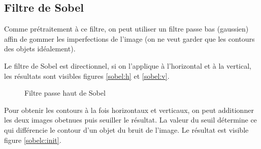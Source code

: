 \documentclass{article}
\begin{document}
\subsection{Filtre de Sobel}
Comme prétraitement à ce filtre, on peut utiliser un filtre passe bas (gaussien) affin de gommer les imperfections de
l'image
(on ne veut garder que les contours des objets idéalement).

Le filtre de Sobel est directionnel, si on l'applique à l'horizontal et à la vertical, les résultats sont visibles
figures \ref{sobel:h} et \ref{sobel:v}.

\begin{figure}[!ht]%
  \centering
  \hspace{0.030\textwidth}
  \caption{Filtre passe haut de Sobel}
  \label{rehauss:init}
\end{figure}

Pour obtenir les contours à la fois horizontaux et verticaux, on peut additionner les deux images obetnues puis
seuiller le résultat. La valeur du seuil détermine ce qui différencie le contour d'un objet du bruit de l'image.
Le résultat est visible figure \ref{sobelc:init}.
\end{document}
